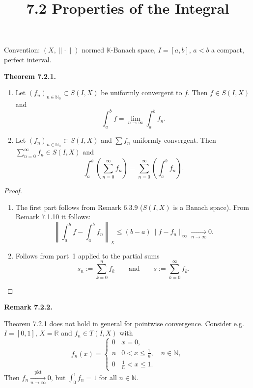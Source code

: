 \documentclass[12pt]{article}
\title{7.2 Properties of the Integral}
\date{}
\newenvironment{satz}[1]{%
  \par\vspace{6pt}\noindent\textbf{Theorem #1.}\itshape\space
}{%
  \par\vspace{6pt}
}
\newenvironment{bemerkung}[1]{%
  \par\vspace{6pt}\noindent\textbf{Remark #1.}\itshape\space
}{%
  \par\vspace{6pt}
}
\begin{document}
\maketitle

Convention: $(X,\|\cdot\|)$ normed $\mathbb K$-Banach space, $I=[a,b]$, $a<b$ a compact, perfect
interval.

\begin{satz}{7.2.1}
\begin{enumerate}
    \item Let $(f_n)_{n\in\mathbb N_0}\subset S(I,X)$ be uniformly convergent to $f$. Then $f\in S(I,X)$ and
    \[
    \int_a^b f=\lim_{n\to\infty}\int_a^b f_n.
    \]

    \item Let $(f_n)_{n\in\mathbb N_0}\subset S(I,X)$ and $\sum f_n$ uniformly convergent. Then
    $\displaystyle\sum_{n=0}^{\infty}f_n\in S(I,X)$ and
    \[
    \int_a^b\left(\sum_{n=0}^{\infty}f_n\right)
    =\sum_{n=0}^{\infty}\left(\int_a^b f_n\right).
    \]
\end{enumerate}
\end{satz}

\begin{proof}
\begin{enumerate}
    \item The first part follows from Remark 6.3.9 ($S(I,X)$ is a Banach space). From Remark 7.1.10 it follows:
    \[
    \left\|\int_a^b f-\int_a^b f_n\right\|_X
    \le(b-a)\|f-f_n\|_\infty
    \xrightarrow[n\to\infty]{}0.
    \]

    \item Follows from part~1 applied to the partial sums
    \[
    s_n:=\sum_{k=0}^{n}f_k
    \qquad\text{and}\qquad
    s:=\sum_{k=0}^{\infty}f_k.
    \]
\end{enumerate}
\end{proof}

\begin{bemerkung}{7.2.2}
Theorem 7.2.1 does not hold in general for pointwise convergence. Consider e.g.\ $I=[0,1]$, $X=\mathbb R$ and $f_n\in T(I,X)$ with
\[
f_n(x)=
\begin{cases}
0 & x=0,\\
n & 0<x\le\tfrac{1}{n},\quad n\in\mathbb N,\\
0 & \tfrac{1}{n}<x\le 1.
\end{cases}
\]
Then $f_n\xrightarrow[n\to\infty]{\mathrm{pkt}}0$, but $\int_0^1 f_n=1$ for all $n\in\mathbb N$.
\end{bemerkung}
\end{document}
